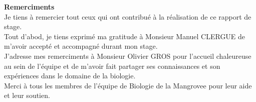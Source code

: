 \begin{center}
    \textbf{\large{Remerciments}} \\[2cm]

    Je tiens à remercier tout ceux qui ont contribué à la réalisation de ce rapport de stage. \\[0.5cm]

    Tout d'abod, je tiens exprimé ma gratitude à Monsieur Manuel CLERGUE de m'avoir accepté et accompagné durant mon stage. \\[0.5cm]

    J'adresse mes remerciments à Monsieur Olivier GROS pour l'accueil chaleureuse au sein de l'équipe et de m'avoir fait partager ses connaissances et son expériences dans le domaine de la biologie. \\[0.5cm]

    Merci à tous les membres de l'équipe de Biologie de la Mangrovee pour leur aide et leur soutien. \\[0.5cm]

    
\end{center}